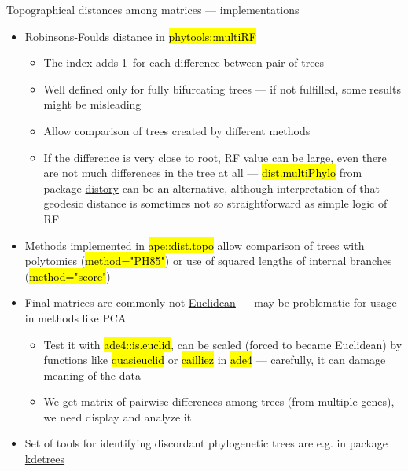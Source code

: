 \documentclass[compress, ucs, xelatex, 11pt, xcolor=svgnames,
	hyperref={
		bookmarks=true,
		unicode=true,
		colorlinks=true,
		pdftitle={Molecular data in R},
		plainpages=false,
		pdfauthor={Vojtech Zeisek},
		pdfsubject={Course about phylogeny and evolution in R},
		pdfcreator={XeLaTeX},
		pdfkeywords={R, evolution, phylogeny, molecular data},
		linkcolor=Tomato,
		anchorcolor=SaddleBrown,
		citecolor=Goldenrod,
		filecolor=DarkMagenta,
		menucolor=Sienna,
		urlcolor=DarkTurquoise,
		pdftex},
	url={hyphens, lowtilde} %
	]{beamer}
\renewcommand{\texttt}[1]{\hl{\ttfamily #1}}
\begin{document}
\begin{frame}[allowframebreaks]{Topographical distances among matrices --- implementations}
	\begin{itemize}
		\item Robinsons-Foulds distance in \texttt{phytools::multiRF}
		\begin{itemize}
			\item The index adds 1~for each difference between pair of trees
			\item Well defined only for fully bifurcating trees --- if not fulfilled, some results might be misleading
			\item Allow comparison of trees created by different methods
			\item If the difference is very close to root, RF value can be large, even there are not much differences in the tree at all --- \texttt{dist.multiPhylo} from package \href{https://CRAN.R-project.org/package=distory}{distory} can be an alternative, although interpretation of that geodesic distance is sometimes not so straightforward as simple logic of RF
		\end{itemize}
		\item Methods implemented in \texttt{ape::dist.topo} allow comparison of trees with polytomies (\texttt{method="PH85"}) or use of squared lengths of internal branches (\texttt{method="score"})
		\item Final matrices are commonly not \href{https://en.wikipedia.org/wiki/Euclidean_distance_matrix}{Euclidean} --- may be problematic for usage in methods like PCA
		\begin{itemize}
			\item Test it with \texttt{ade4::is.euclid}, can be scaled (forced to became Euclidean) by functions like \texttt{quasieuclid} or \texttt{cailliez} in \texttt{ade4} --- carefully, it can damage meaning of the data
			\item We get matrix of pairwise differences among trees (from multiple genes), we need display and analyze it
		\end{itemize}
		\item Set of tools for identifying discordant phylogenetic trees are e.g. in package \href{https://CRAN.R-project.org/package=kdetrees}{kdetrees}
	\end{itemize}
\end{frame}
\end{document}
